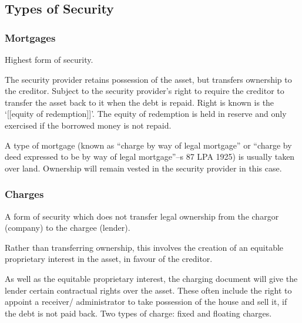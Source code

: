 \documentclass[
]{article}
\begin{document}
\hypertarget{types-of-security}{%
\subsection{Types of Security}\label{types-of-security}}

\hypertarget{mortgages}{%
\subsubsection{Mortgages}\label{mortgages}}

Highest form of security.

The security provider retains possession of the asset, but transfers
ownership to the creditor. Subject to the security provider's right to
require the creditor to transfer the asset back to it when the debt is
repaid. Right is known is the `{[}{[}equity of redemption{]}{]}'. The
equity of redemption is held in reserve and only exercised if the
borrowed money is not repaid.

A type of mortgage (known as ``charge by way of legal mortgage'' or
``charge by deed expressed to be by way of legal mortgage''--s 87 LPA
1925) is usually taken over land. Ownership will remain vested in the
security provider in this case.

\hypertarget{charges}{%
\subsubsection{Charges}\label{charges}}

A form of security which does not transfer legal ownership from the
chargor (company) to the chargee (lender).

Rather than transferring ownership, this involves the creation of an
equitable proprietary interest in the asset, in favour of the creditor.

As well as the equitable proprietary interest, the charging document
will give the lender certain contractual rights over the asset. These
often include the right to appoint a receiver/ administrator to take
possession of the house and sell it, if the debt is not paid back. Two
types of charge: fixed and floating charges.
\end{document}
